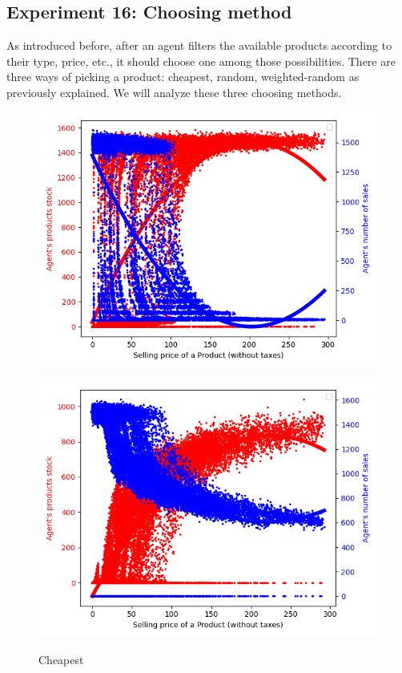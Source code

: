 {{{{{{{{{{{{{{    \subsection{Experiment 16: Choosing method}
    As introduced before, after an agent filters the available products according to their type, price, etc., it should choose one among those possibilities. There are three ways of picking a product: cheapest, random, weighted-random as previously explained. We will analyze these three choosing methods.

    \begin{figure}[H]
            \includegraphics[width=\linewidth]{img/exp/16_1.png}\label{fig:cheapest}
            \caption{Cheapest}
        \endminipage\hfill
            \includegraphics[width=\linewidth]{img/exp/16_2.png}\label{fig:random}

\end{figure}}}}}}}}}}}}}}}
